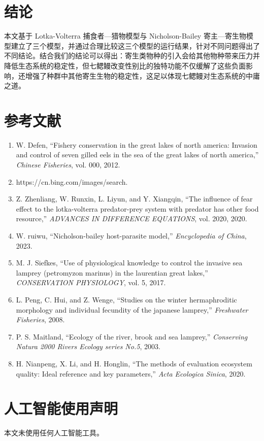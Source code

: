 \documentclass[11pt,a4paper]{ctexart}
\begin{document}
\section{结论}

本文基于 Lotka-Volterra 捕食者—猎物模型与 Nicholson-Bailey 寄主—寄生物模型建立了三个模型，并通过合理比较这三个模型的运行结果，针对不同问题得出了不同结论。结合我们的结论可以得出：寄生类物种的引入会给其他物种带来压力并降低生态系统的稳定性，但七鳃鳗改变性别比的独特功能不仅缓解了这些负面影响，还增强了种群中其他寄生生物的稳定性，这足以体现七鳃鳗对生态系统的中庸之道。

\section*{参考文献}

\begin{enumerate}
\item[{[1]}] W. Defen, ``Fishery conservation in the great lakes of north america: Invasion and control of seven gilled eels in the sea of the great lakes of north america,'' \emph{Chinese Fisheries}, vol. 000, 2012.
\item[{[2]}] https://cn.bing.com/images/search.
\item[{[3]}] Z. Zhenliang, W. Runxin, L. Liyun, and Y. Xiangqin, ``The influence of fear effect to the lotka-volterra predator-prey system with predator has other food resource,'' \emph{ADVANCES IN DIFFERENCE EQUATIONS}, vol. 2020, 2020.
\item[{[4]}] W. ruiwu, ``Nicholson-bailey host-parasite model,'' \emph{Encyclopedia of China}, 2023.
\item[{[5]}] M. J. Siefkes, ``Use of physiological knowledge to control the invasive sea lamprey (petromyzon marinus) in the laurentian great lakes,'' \emph{CONSERVATION PHYSIOLOGY}, vol. 5, 2017.
\item[{[6]}] L. Peng, C. Hui, and Z. Wenge, ``Studies on the winter hermaphroditic morphology and individual fecundity of the japanese lamprey,'' \emph{Freshwater Fisheries}, 2008.
\item[{[7]}] P. S. Maitland, ``Ecology of the river, brook and sea lamprey,'' \emph{Conserving Natura 2000 Rivers Ecology series No.5}, 2003.
\item[{[8]}] H. Nianpeng, X. Li, and H. Honglin, ``The methods of evaluation ecosystem quality: Ideal reference and key parameters,'' \emph{Acta Ecologica Sinica}, 2020.
\end{enumerate}

\section*{人工智能使用声明}

本文未使用任何人工智能工具。
\end{document}
